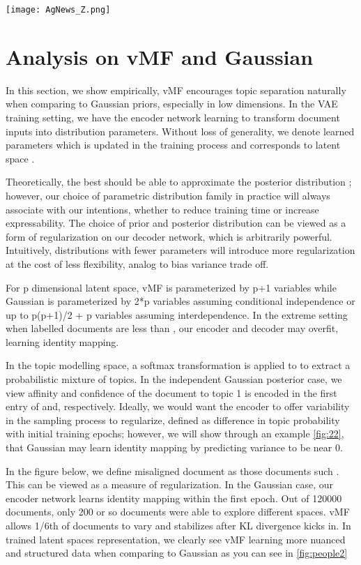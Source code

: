 \documentclass[11pt]{article}
\begin{document}
\begin{figure*}[h]
\centering
\texttt{[image: AgNews\_Z.png]}

\caption{Z Space}
\label{fig:people2}
\end{figure*}

\section{Analysis on vMF and Gaussian}
\label{appendix:appendix2}
In this section, we show empirically, vMF encourages topic separation naturally when comparing to Gaussian priors, especially in low dimensions. In the VAE training setting, we have the encoder network  learning to transform document inputs  into distribution parameters. Without loss of generality, we denote learned parameters  which is updated in the training process and corresponds to latent space .

Theoretically, the best  should be able to approximate the posterior distribution ; however, our choice of parametric distribution family in practice will always associate with our intentions, whether to reduce training time or increase expressability. The choice of prior and posterior distribution can be viewed as a form of regularization on our decoder network, which is arbitrarily powerful. Intuitively, distributions with fewer parameters will introduce more regularization at the cost of less flexibility, analog to bias variance trade off.

For p dimensional latent space, vMF is parameterized by p+1 variables while Gaussian is parameterized by 2*p variables assuming conditional independence or up to p(p+1)/2 + p variables assuming interdependence. In the extreme setting when labelled documents are less than , our encoder and decoder may overfit, learning identity mapping.

In the topic modelling space, a softmax transformation  is applied to  to extract a probabilistic mixture of topics. In the independent Gaussian posterior case, we view affinity and confidence of the document to topic 1 is encoded in the first entry of  and,  respectively. Ideally, we would want the encoder to offer variability in the sampling process to regularize, defined as difference in topic probability with initial training epochs; however, we will show through an example \ref{fig:22}, that Gaussian may learn identity mapping by predicting variance to be near 0. 

In the figure below, we define misaligned document as those documents such . This can be viewed as a measure of regularization. In the Gaussian case, our encoder network learns identity mapping within the first epoch. Out of 120000 documents, only 200 or so documents were able to explore different spaces. vMF allows 1/6th of documents to vary and stabilizes after KL divergence kicks in. In trained latent spaces representation, we clearly see vMF learning more nuanced and structured data when comparing to Gaussian as you can see in \ref{fig:people2}
\end{document}
